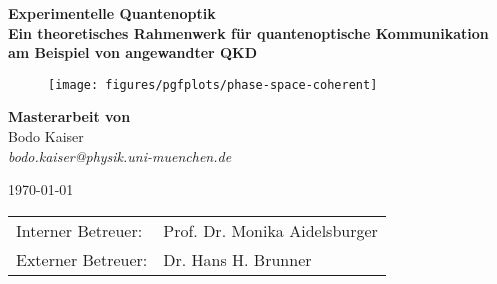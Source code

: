 \makeatletter
\begin{titlepage}
    \begin{otherlanguage}{ngerman}
		\begin{center}
			\large
			    \textbf{\textsf{Experimentelle Quantenoptik}}\\
		    \vspace{0.8em}
			\huge
		    \textbf{\textsf{Ein theoretisches Rahmenwerk für quantenoptische Kommunikation am Beispiel von angewandter QKD}}\\
			
			\vspace{1.2em}
			\begin{figure}[htb]
				\centering
			    \texttt{[image: figures/pgfplots/phase-space-coherent]}
			\end{figure}
			
			\vspace{.6em}
		    \large
		    \textbf{Masterarbeit von}\\
			\vspace{.8em}
		    \large
			Bodo Kaiser\\
		    \vspace{.2em}
			\textit{bodo.kaiser@physik.uni-muenchen.de}
	
		    \large
		    \today
	
		    \vspace{1.9em}
			\normalsize
			\begin{tabular}{ll}
			Interner Betreuer: & Prof. Dr. Monika Aidelsburger \\
			Externer Betreuer: & Dr. Hans H. Brunner \\
			\end{tabular}
		\end{center}
    \end{otherlanguage}
\end{titlepage}
\makeatother
